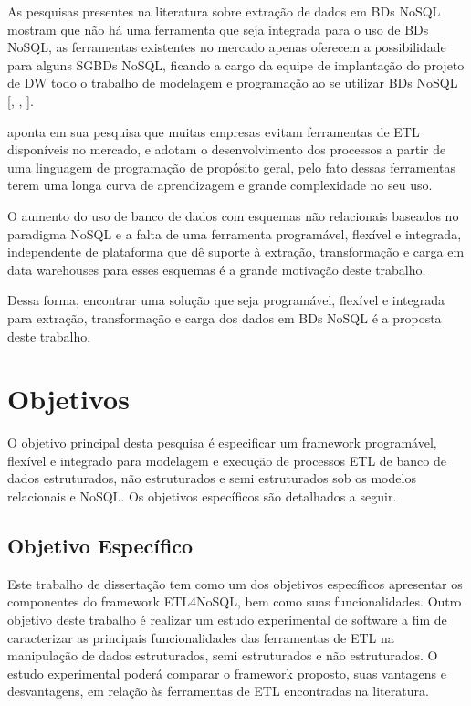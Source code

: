 As pesquisas presentes na literatura sobre extração de dados em BDs NoSQL mostram que não há uma ferramenta que seja integrada para o uso de BDs NoSQL, as ferramentas existentes no mercado apenas oferecem a possibilidade para alguns SGBDs NoSQL, ficando a cargo da equipe de implantação do projeto de DW todo o trabalho de modelagem e programação ao se utilizar BDs NoSQL [\cite{silva:2016}, \cite{chevalier:2015}, \cite{liu:2013}].

\cite{silva:2012} aponta em sua pesquisa que muitas empresas evitam ferramentas de ETL disponíveis no mercado, e adotam o desenvolvimento dos processos a partir de uma linguagem de programação de propósito geral, pelo fato dessas ferramentas terem uma longa curva de aprendizagem e grande complexidade no seu uso.

O aumento do uso de banco de dados com esquemas não relacionais baseados no paradigma NoSQL e a falta de uma ferramenta programável, flexível e integrada, independente de plataforma que dê suporte à extração, transformação e carga em data warehouses para esses esquemas é a grande motivação deste trabalho.

Dessa forma, encontrar uma solução que seja programável, flexível e integrada para extração, transformação e carga dos dados em BDs NoSQL é a proposta deste trabalho.





\section{Objetivos}

O objetivo principal desta pesquisa é especificar um framework programável, flexível e integrado para modelagem e execução de processos ETL de banco de dados estruturados, não estruturados e semi estruturados sob os modelos relacionais e NoSQL. Os objetivos específicos são detalhados a seguir.

\subsection{Objetivo Específico}

Este trabalho de dissertação tem como um dos objetivos específicos apresentar os componentes do framework ETL4NoSQL, bem como suas funcionalidades. Outro objetivo deste trabalho é realizar um estudo experimental de software a fim de caracterizar as principais funcionalidades das ferramentas de ETL na manipulação de dados estruturados, semi estruturados e não estruturados. O estudo experimental poderá comparar o framework proposto, suas vantagens e desvantagens, em relação às ferramentas de ETL encontradas na literatura.

